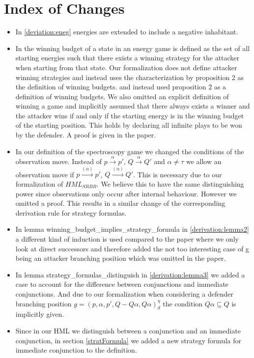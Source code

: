 \section{Index of Changes}
\begin{itemize}
    \item In \ref{deviation:eneg} energies are extended to include a negative inhabitant. 
    \item In \cite{bisping2023lineartimebranchingtime} the winning budget of a state in an energy game is defined as the set of all starting energies such that there exists a winning strategy for the attacker when starting from that state. Our formalization does not define attacker winning strategies and instead uses the characterization by proposition 2 \cite[p. 9]{bisping2023lineartimebranchingtime} as the definition of winning budgets.
and instead used proposition 2 as a definition of winning budgets. We also omitted an explicit definition of winning a game and implicitly assumed that there 
always exists a winner and the attacker wins if and only if the starting energy is in the winning budget of the starting position. This holds by declaring all
infinite plays to be won by the defender. A proof is given in the paper. 
    \item In our definition of the spectroscopy game we changed the conditions of the observation move. 
    Instead of $p \overset{\alpha}{\longrightarrow}p'$, $Q \overset{\alpha}{\longrightarrow} Q'$ and $\alpha \neq \tau$
    we allow an observation move if  $p \overset{(\alpha)}{\longrightarrow}p'$, $Q \overset{(\alpha)}{\longrightarrow} Q'$.
    This is necessary due to our formalization of $HML_{SRBB}$. We believe this to have the same distinguishing power 
    since observations only occur after internal behaviour. However we omitted a proof. 
    This results in a similar change of the corresponding derivation rule for strategy formulas.
    \item In lemma winning\_budget\_implies\_strategy\_formula in \ref{derivation:lemma2} a different kind of induction is used compared to the paper 
    where we only look at direct successors and therefore added the not too interesting case of g being an 
    attacker branching position which was omitted in the paper.
   \item In lemma strategy\_formulas\_distinguish in  \ref{derivation:lemma3} we added a case to account for the difference between 
conjunctions and immediate conjunctions. And due to our formalization when considering a
defender branching position $g=(p,\alpha ,p', Q - Q\alpha, Q\alpha)_d^\eta$ the condition 
$Q \alpha \subseteq Q$ is implicitly given.
  \item Since in our HML we distinguish between a conjunction and an immediate conjunction, in section \ref{stratFormula} 
we added a new strategy formula for immediate conjunction to the definition.
\end{itemize}
